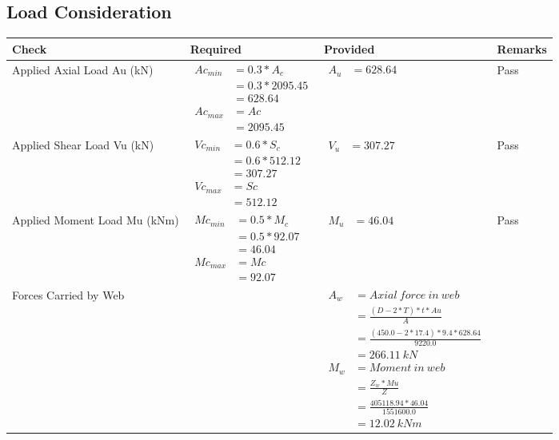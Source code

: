\documentclass{article}%
\begin{document}
\subsection{Load Consideration}%
\label{subsec:LoadConsideration}%
\renewcommand{\arraystretch}{1.2}%
\begin{longtable}{|p{4cm}|p{3.5cm}|p{6.5cm}|p{1.5cm}|}%
\hline%
\rowcolor{OsdagGreen}%
Check&Required&Provided&Remarks\\%
\hline%
\endhead%
\hline%
Applied Axial Load Au (kN)&$\begin{aligned} Ac_{min} &= 0.3 * A_c\\ &= 0.3 *2095.45\\ &=628.64\\ Ac_{max} &= Ac \\ &=2095.45\end{aligned}$&$\begin{aligned} A_u &=628.64\end{aligned}$&Pass\\%
\hline%
Applied Shear Load Vu (kN)&$\begin{aligned} Vc_{min} &= 0.6 * S_c\\ &= 0.6 *512.12\\ &=307.27\\ Vc_{max} &= Sc \\ &=512.12\end{aligned}$&$\begin{aligned} V_u &=307.27\end{aligned}$&Pass\\%
\hline%
Applied Moment Load Mu (kNm)&$\begin{aligned} Mc_{min} &= 0.5 * M_c\\ &= 0.5 *92.07\\ &=46.04\\  Mc_{max} &= Mc \\ &=92.07\end{aligned}$&$\begin{aligned} M_u &=46.04\end{aligned}$&Pass\\%
\hline%
Forces Carried by Web&&$\begin{aligned}A_w &= Axial~ force~ in~ web  \\   &= \frac{(D- 2*T)*t* Au }{A} \\ &= \frac{(450.0- 2*17.4)*9.4*628.64 }{9220.0} \\ &=266.11~ kN\\ M_w &= Moment ~in ~web  \\  &= \frac{Z_w * Mu}{Z} \\ &= \frac{405118.94 * 46.04}{1551600.0} \\ &=12.02~{kNm}\end{aligned}$&\\%

\end{longtable}
\end{document}
